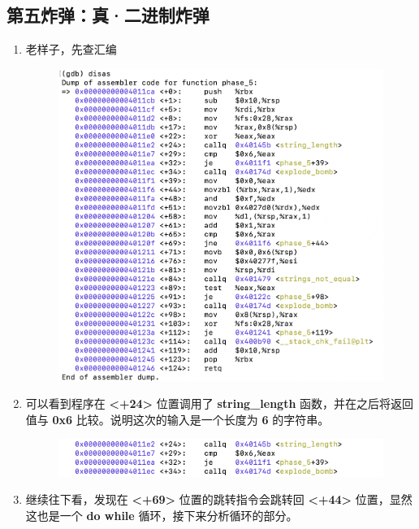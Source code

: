     \subsection{第五炸弹：真·二进制炸弹}
        \begin{enumerate}
            \item 老样子，先查汇编
                \begin{figure}[htbp]
                    \hspace*{1.5cm}
                    \includegraphics*[width = 12cm]{s5_0.png}
                \end{figure}
            \item 可以看到程序在 \textbf{<+24>} 位置调用了 \textbf{string\_length} 函数，并在之后将返回值与 \textbf{0x6} 比较。说明这次的输入是一个长度为 \textbf{6} 的字符串。
                \begin{figure}[htbp]
                    \hspace*{1.5cm}
                    \includegraphics*[width = 12cm]{s5_1.png}
                \end{figure}
            \item 继续往下看，发现在 \textbf{<+69>} 位置的跳转指令会跳转回 \textbf{<+44>} 位置，显然这也是一个 \textbf{do while} 循环，接下来分析循环的部分。
                \begin{figure}[htbp]

\end{figure}
\end{enumerate}
